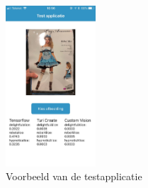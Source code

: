 \begin{figure}
    \centering
        \includegraphics[width=0.3\textwidth]{img/testapplicatie.jpg}
    \caption{Voorbeeld van de testapplicatie}
    \label{fig:testapplicatie}
  \end{figure}
